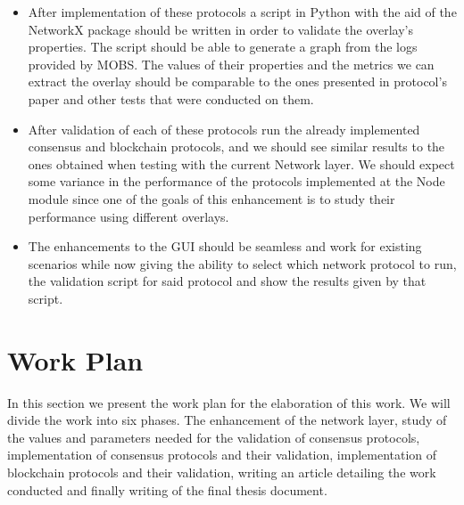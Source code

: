 \begin{itemize}
  \item After implementation of these protocols a script in Python with the aid of
the NetworkX package should be written in order to validate the overlay's properties.
The script should be able to generate a graph from the logs provided by MOBS.
The values of their properties and the metrics we can extract the overlay should be
comparable to the ones presented in protocol's paper and other tests that were conducted
on them.
  \item After validation of each of these protocols run the already implemented
consensus and blockchain protocols, and we should see similar results to the ones obtained
when testing with the current Network layer. We should expect some variance in the 
performance of the protocols implemented at the Node module since one of the
goals of this enhancement is to study their performance using different overlays.
  \item The enhancements to the GUI should be seamless and work for existing scenarios
while now giving the ability to select which network protocol to run, the validation
script for said protocol and show the results given by that script.
\end{itemize}


\section{Work Plan}\label{sub:work_plan}

In this section we present the work plan for the elaboration of this work.
We will divide the work into six phases. The enhancement of the network layer,
study of the values and parameters needed for the validation of consensus protocols,
implementation of consensus protocols and their validation, implementation of blockchain
protocols and their validation, writing an article detailing the work conducted and
finally writing of the final thesis document.

